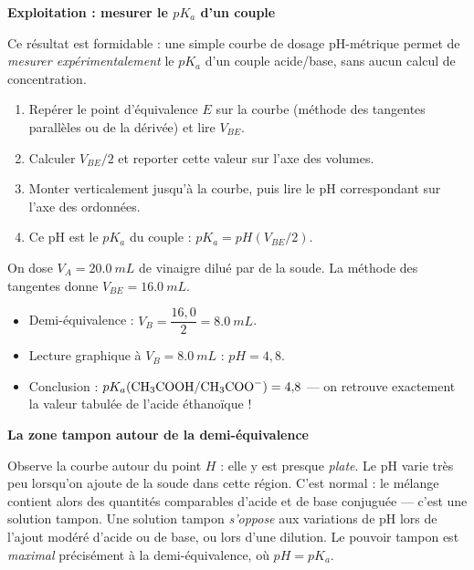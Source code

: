 \documentclass[11pt]{article}
\newcommand{\cle}[1]{{\popxbold\color{popdark}#1}}
\begin{document}
\textbf{Exploitation : mesurer le $pK_a$ d'un couple}\par

Ce résultat est formidable : une simple courbe de dosage pH-métrique permet de \emph{mesurer expérimentalement} le $pK_a$ d'un couple acide/base, sans aucun calcul de concentration.

\begin{methode}
\begin{enumerate}
\item Repérer le point d'équivalence $E$ sur la courbe (méthode des tangentes parallèles ou de la dérivée) et lire $V_{BE}$.
\item Calculer $V_{BE}/2$ et reporter cette valeur sur l'axe des volumes.
\item Monter verticalement jusqu'à la courbe, puis lire le pH correspondant sur l'axe des ordonnées.
\item Ce pH est le $pK_a$ du couple : $pK_a = pH\left(V_{BE}/2\right)$.
\end{enumerate}
\end{methode}

\begin{exemplebox}
On dose $V_A = \SI{20,0}{mL}$ de vinaigre dilué par de la soude. La méthode des tangentes donne $V_{BE} = \SI{16,0}{mL}$.
\begin{itemize}
\item Demi-équivalence : $V_B = \dfrac{16{,}0}{2} = \SI{8,0}{mL}$.
\item Lecture graphique à $V_B = \SI{8,0}{mL}$ : $pH = 4{,}8$.
\item Conclusion : $pK_a(\ce{CH3COOH}/\ce{CH3COO-}) = 4{,}8$ — on retrouve exactement la valeur tabulée de l'acide éthanoïque !
\end{itemize}
\end{exemplebox}

\textbf{La zone tampon autour de la demi-équivalence}\par

Observe la courbe autour du point $H$ : elle y est presque \emph{plate}. Le pH varie très peu lorsqu'on ajoute de la soude dans cette région. C'est normal : le mélange contient alors des quantités comparables d'acide  et de base conjuguée  — c'est une \cle{solution tampon}. Une solution tampon \emph{s'oppose} aux variations de pH lors de l'ajout modéré d'acide ou de base, ou lors d'une dilution. Le pouvoir tampon est \emph{maximal} précisément à la demi-équivalence, où $pH = pK_a$.
\end{document}
